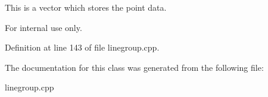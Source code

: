 This is a vector which stores the point data. 

\begin{DoxyInternal}{For internal use only.}
\end{DoxyInternal}


Definition at line 143 of file linegroup.cpp.



The documentation for this class was generated from the following file:\begin{DoxyCompactItemize}
\item 
linegroup.cpp\end{DoxyCompactItemize}
